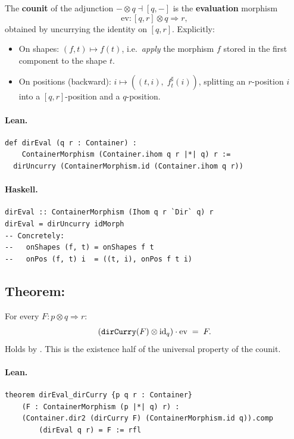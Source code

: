 \documentclass[11pt,a4paper]{article}
\begin{document}
\begin{defn}
The \textbf{counit} of the adjunction $- \otimes q \dashv [q,-]$ is the
\textbf{evaluation} morphism
\[
  \mathrm{ev} : [q, r] \otimes q \Rightarrow r,
\]
obtained by uncurrying the identity on $[q, r]$.  Explicitly:
\begin{itemize}
  \item On shapes: $(f, t) \mapsto f(t)$, i.e.\ \emph{apply} the morphism $f$
    stored in the first component to the shape $t$.
  \item On positions (backward): $i \mapsto ((t, i),\; f^\sharp_t(i))$,
    splitting an $r$-position $i$ into a $[q,r]$-position and a $q$-position.
\end{itemize}
\end{defn}

\paragraph{Lean.}
\begin{lstlisting}[style=lean]
def dirEval (q r : Container) :
    ContainerMorphism (Container.ihom q r |*| q) r :=
  dirUncurry (ContainerMorphism.id (Container.ihom q r))
\end{lstlisting}

\paragraph{Haskell.}
\begin{lstlisting}[style=haskell]
dirEval :: ContainerMorphism (Ihom q r `Dir` q) r
dirEval = dirUncurry idMorph
-- Concretely:
--   onShapes (f, t) = onShapes f t
--   onPos (f, t) i  = ((t, i), onPos f t i)
\end{lstlisting}


\subsection{Theorem: }

\begin{thm}
For every $F : p \otimes q \Rightarrow r$:
\[
  (\texttt{dirCurry}(F) \otimes \mathrm{id}_q) \cdot \mathrm{ev} \;=\; F.
\]
Holds by .  This is the existence half of the universal property of
the counit.
\end{thm}

\paragraph{Lean.}
\begin{lstlisting}[style=lean]
theorem dirEval_dirCurry {p q r : Container}
    (F : ContainerMorphism (p |*| q) r) :
    (Container.dir2 (dirCurry F) (ContainerMorphism.id q)).comp
        (dirEval q r) = F := rfl
\end{lstlisting}
\end{document}
